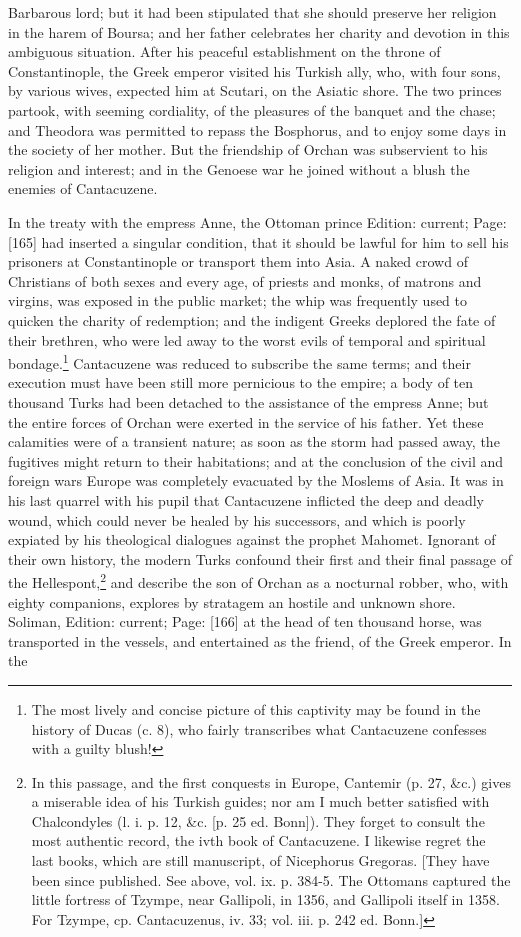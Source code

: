 Barbarous lord; but it had been stipulated that she should preserve her religion in the harem of Boursa; and her father celebrates her charity and devotion in this ambiguous situation. After his peaceful establishment on the throne of Constantinople, the Greek emperor visited his Turkish ally, who, with four sons, by various wives, expected him at Scutari, on the Asiatic shore. The two princes partook, with seeming cordiality, of the pleasures of the banquet and the chase; and Theodora was permitted to repass the Bosphorus, and to enjoy some days in the society of her mother. But the friendship of Orchan was subservient to his religion and interest; and in the Genoese war he joined without a blush the enemies of Cantacuzene.

In the treaty with the empress Anne, the Ottoman prince Edition: current; Page: [165] had inserted a singular condition, that it should be lawful for him to sell his prisoners at Constantinople or transport them into Asia. A naked crowd of Christians of both sexes and every age, of priests and monks, of matrons and virgins, was exposed in the public market; the whip was frequently used to quicken the charity of redemption; and the indigent Greeks deplored the fate of their brethren, who were led away to the worst evils of temporal and spiritual bondage.\footnote{The most lively and concise picture of this captivity may be found in the history of Ducas (c. 8), who fairly transcribes what Cantacuzene confesses with a guilty blush!} Cantacuzene was reduced to subscribe the same terms; and their execution must have been still more pernicious to the empire; a body of ten thousand Turks had been detached to the assistance of the empress Anne; but the entire forces of Orchan were exerted in the service of his father. Yet these calamities were of a transient nature; as soon as the storm had passed away, the fugitives might return to their habitations; and at the conclusion of the civil and foreign wars Europe was completely evacuated by the Moslems of Asia. It was in his last quarrel with his pupil that Cantacuzene inflicted the deep and deadly wound, which could never be healed by his successors, and which is poorly expiated by his theological dialogues against the prophet Mahomet. Ignorant of their own history, the modern Turks confound their first and their final passage of the Hellespont,\footnote{In this passage, and the first conquests in Europe, Cantemir (p. 27, \&c.) gives a miserable idea of his Turkish guides; nor am I much better satisfied with Chalcondyles (l. i. p. 12, \&c. [p. 25 ed. Bonn]). They forget to consult the most authentic record, the ivth book of Cantacuzene. I likewise regret the last books, which are still manuscript, of Nicephorus Gregoras. [They have been since published. See above, vol. ix. p. 384-5. The Ottomans captured the little fortress of Tzympe, near Gallipoli, in 1356, and Gallipoli itself in 1358. For Tzympe, cp. Cantacuzenus, iv. 33; vol. iii. p. 242 ed. Bonn.]} and describe the son of Orchan as a nocturnal robber, who, with eighty companions, explores by stratagem an hostile and unknown shore. Soliman, Edition: current; Page: [166] at the head of ten thousand horse, was transported in the vessels, and entertained as the friend, of the Greek emperor. In the 